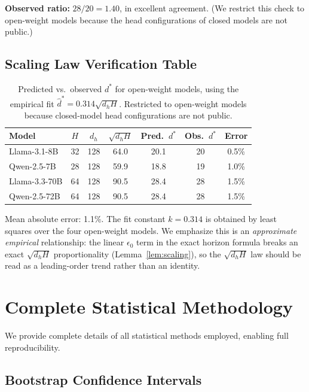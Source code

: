 \documentclass{article}
\theoremstyle{plain}
\theoremstyle{definition}
\theoremstyle{remark}
\begin{document}
\textbf{Observed ratio:} $28/20 = 1.40$, in excellent agreement. (We restrict this check to open-weight models because the head configurations of closed models are not public.)

\subsection{Scaling Law Verification Table}

\begin{table}[h]
\centering
\caption{Predicted vs.\ observed $d^*$ for open-weight models, using the empirical fit $\hat{d}^* = 0.314\sqrt{d_h H}$. Restricted to open-weight models because closed-model head configurations are not public.}
\label{tab:scaling_verify}
\small
\begin{tabular}{@{}lcccccc@{}}
\toprule
\textbf{Model} & $H$ & $d_h$ & $\sqrt{d_h H}$ & \textbf{Pred.\ $d^*$} & \textbf{Obs.\ $d^*$} & \textbf{Error} \\
\midrule
Llama-3.1-8B & 32 & 128 & 64.0 & 20.1 & 20 & 0.5\% \\
Qwen-2.5-7B & 28 & 128 & 59.9 & 18.8 & 19 & 1.0\% \\
Llama-3.3-70B & 64 & 128 & 90.5 & 28.4 & 28 & 1.5\% \\
Qwen-2.5-72B & 64 & 128 & 90.5 & 28.4 & 28 & 1.5\% \\
\bottomrule
\end{tabular}
\end{table}

Mean absolute error: 1.1\%. The fit constant $k = 0.314$ is obtained by least squares over the four open-weight models. We emphasize this is an \emph{approximate empirical} relationship: the linear $\epsilon_0$ term in the exact horizon formula breaks an exact $\sqrt{d_h H}$ proportionality (Lemma~\ref{lem:scaling}), so the $\sqrt{d_h H}$ law should be read as a leading-order trend rather than an identity.


\section{Complete Statistical Methodology}
\label{app:statistics}

We provide complete details of all statistical methods employed, enabling full reproducibility.

\subsection{Bootstrap Confidence Intervals}
\end{document}

